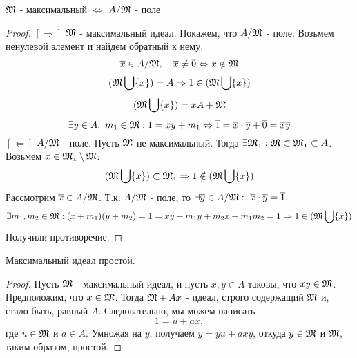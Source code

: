 \begin{thm}
$\mathfrak{M}$ - максимальный $\Leftrightarrow$ $A/\mathfrak{M}$ - поле
\end{thm}
\begin{proof}
$[\Rightarrow]$ $\mathfrak{M}$ - максимальный идеал. Покажем, что $A/\mathfrak{M}$ - поле. Возьмем ненулевой элемент и найдем обратный
к нему.
\[\overline{x} \in A/\mathfrak{M},~~~\overline{x} \neq \overline{0} \Leftrightarrow x \notin \mathfrak{M}\]
\[(\mathfrak{M}\bigcup\{x\}) = A \Rightarrow 1 \in (\mathfrak{M}\bigcup\{x\})\]
\[(\mathfrak{M}\bigcup\{x\}) = xA + \mathfrak{M}\]
\[\exists y \in A, ~ m_1 \in \mathfrak{M}: 1 = xy + m_1 \Leftrightarrow \overline{1} = \overline{x}\cdot\overline{y} + \overline{0}
 = \overline{xy}
\]
$[\Leftarrow]$ $A/\mathfrak{M}$ - поле. Пусть $\mathfrak{M}$ не максимальный. Тогда $\exists \mathfrak{M_1}: \mathfrak{M} \subset \mathfrak{M_1}
\subset A$. Возьмем $x \in \mathfrak{M_1}\setminus\mathfrak{M}$:
\[(\mathfrak{M}\bigcup\{x\}) \subset \mathfrak{M_1} \Rightarrow 1 \notin (\mathfrak{M}\bigcup\{x\})\]
Рассмотрим $\overline{x} \in A/\mathfrak{M}$. Т.к. $A/\mathfrak{M}$ - поле, то $\exists \overline{y} \in A/\mathfrak{M}:~
\overline{x}\cdot\overline{y} = \overline{1}.$
\[\exists m_1, m_2 \in \mathfrak{M}: (x + m_1)(y + m_2) = 1 = xy + m_1y + m_2x + m_1m_2 = 1 \Rightarrow 1 \in
(\mathfrak{M}\bigcup\{x\})\]
Получили противоречие.
\end{proof}

\begin{thm}
Максимальный идеал простой.
\end{thm}
\begin{proof}
Пусть $\mathfrak{M}$ - максимальный идеал, и пусть $x, y \in A$ таковы, что $xy \in \mathfrak{M}$. Предположим, что $x \in \mathfrak{M}$.
Тогда $\mathfrak{M} + Ax$ - идеал, строго содержащий $\mathfrak{M}$ и,  стало быть, равный $A$. Следовательно, мы можем написать
\[1 = u + ax,\] где $u \in \mathfrak{M}$ и $a \in A$. Умножая на $y$, получаем $y = yu + axy$, откуда $y \in \mathfrak{M}$ и $\mathfrak{M}$,
таким образом, простой. 
\end{proof}